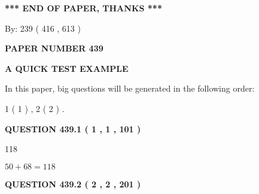 \documentclass[12pt]{article}
\begin{document}
 
 
 
   
   
 \vspace{0.2in}
 
   
   
   
   
\vspace{1.0in} 
{\textbf{\large{ *** END OF PAPER, THANKS *** }}} 
   
   
\hspace{1.0in} By: 
 239 ( 416 ,  613 )
   
   
   
   
\newpage 
\setcounter{page}{ 
   439001 } 
   
   
   
   
 {\textbf{ \Large{ PAPER NUMBER  439  }}}
   
   
\vspace{0.2in}
   
   
   
   
   
   
 \vspace{0.2in}
{\LARGE {\textbf{ A QUICK TEST EXAMPLE}}}
   
   
   
\vspace{0.2in}
   
In this paper, big questions will be generated in the following order: 
   
   
   1 ( 1 )
 ,
   2 ( 2 )
 .
  
\vspace{0.2in}
  
{\textbf{\Large{QUESTION
439.1 
 ( 1 , 1 , 101 )
}}}
  
  
 
 
\noindent{}

118
 
 
 
 
\noindent{}

$ %
50 +  %
68=   %
118$
 
 
  
\vspace{0.2in}
  
{\textbf{\Large{QUESTION
439.2 
 ( 2 , 2 , 201 )
}}}
  
\end{document}
